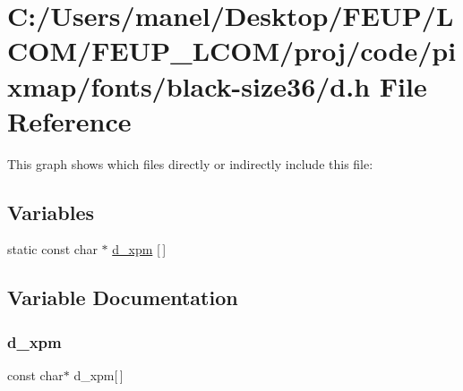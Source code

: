 \hypertarget{black-size36_2d_8h}{}\section{C\+:/\+Users/manel/\+Desktop/\+F\+E\+U\+P/\+L\+C\+O\+M/\+F\+E\+U\+P\+\_\+\+L\+C\+O\+M/proj/code/pixmap/fonts/black-\/size36/d.h File Reference}
\label{black-size36_2d_8h}
This graph shows which files directly or indirectly include this file\+:
\subsection*{Variables}
\begin{DoxyCompactItemize}
\item 
static const char $\ast$ \mbox{\hyperlink{black-size36_2d_8h_a0eb4675892dc1fb2b0b9c7ce03bccdd6}{d\+\_\+xpm}} \mbox{[}$\,$\mbox{]}
\end{DoxyCompactItemize}


\subsection{Variable Documentation}
\mbox{\label{black-size36_2d_8h_a0eb4675892dc1fb2b0b9c7ce03bccdd6}} 
\subsubsection{\texorpdfstring{d\_xpm}{d\_xpm}}
{\footnotesize\ttfamily const char$\ast$ d\+\_\+xpm\mbox{[}$\,$\mbox{]}\hspace{0.3cm}{\ttfamily [static]}}

